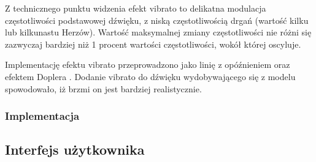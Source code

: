 Z technicznego punktu widzenia efekt vibrato to delikatna modulacja częstotliwości podstawowej dźwięku, z niską częstotliwością drgań (wartość kilku lub kilkunastu Herzów). Wartość maksymalnej zmiany częstotliwości nie różni się zazwyczaj bardziej niż 1 procent wartości częstotliwości, wokół której oscyluje.


Implementację efektu vibrato przeprowadzono jako linię z opóźnieniem oraz efektem Doplera \cite{bowed_3}. Dodanie vibrato do dźwięku wydobywającego się z modelu spowodowało, iż brzmi on jest bardziej realistycznie.

\subsubsection{Implementacja}

\subsection{Interfejs użytkownika}